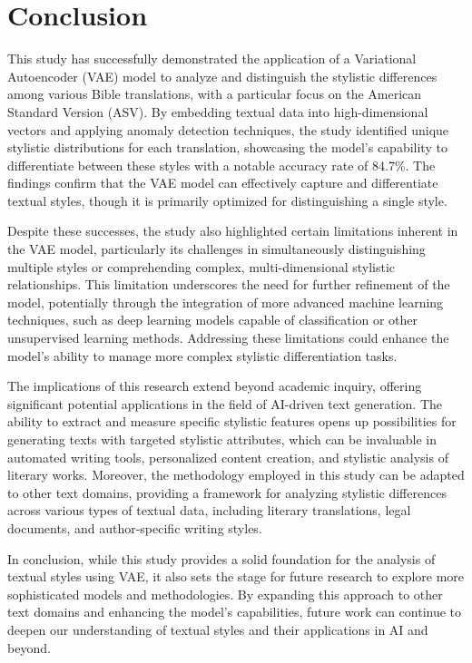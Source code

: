 \section{Conclusion}\label{sec:conclusion}

This study has successfully demonstrated the application of a Variational Autoencoder (VAE) model to analyze and distinguish the stylistic differences among various Bible translations, with a particular focus on the American Standard Version (ASV). By embedding textual data into high-dimensional vectors and applying anomaly detection techniques, the study identified unique stylistic distributions for each translation, showcasing the model’s capability to differentiate between these styles with a notable accuracy rate of 84.7\%. The findings confirm that the VAE model can effectively capture and differentiate textual styles, though it is primarily optimized for distinguishing a single style.

Despite these successes, the study also highlighted certain limitations inherent in the VAE model, particularly its challenges in simultaneously distinguishing multiple styles or comprehending complex, multi-dimensional stylistic relationships. This limitation underscores the need for further refinement of the model, potentially through the integration of more advanced machine learning techniques, such as deep learning models capable of classification or other unsupervised learning methods. Addressing these limitations could enhance the model’s ability to manage more complex stylistic differentiation tasks.

The implications of this research extend beyond academic inquiry, offering significant potential applications in the field of AI-driven text generation. The ability to extract and measure specific stylistic features opens up possibilities for generating texts with targeted stylistic attributes, which can be invaluable in automated writing tools, personalized content creation, and stylistic analysis of literary works. Moreover, the methodology employed in this study can be adapted to other text domains, providing a framework for analyzing stylistic differences across various types of textual data, including literary translations, legal documents, and author-specific writing styles.

In conclusion, while this study provides a solid foundation for the analysis of textual styles using VAE, it also sets the stage for future research to explore more sophisticated models and methodologies. By expanding this approach to other text domains and enhancing the model’s capabilities, future work can continue to deepen our understanding of textual styles and their applications in AI and beyond.
